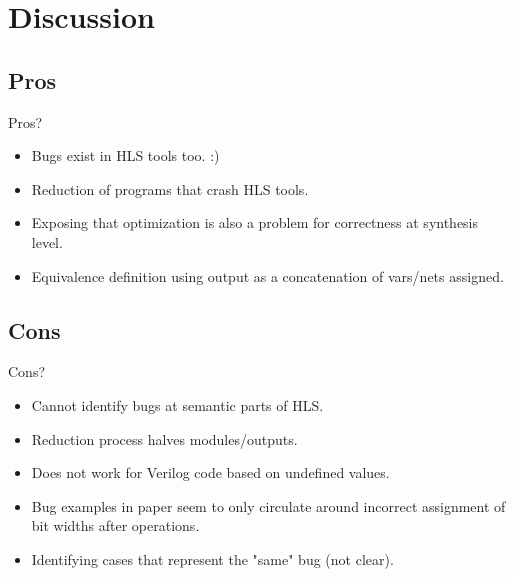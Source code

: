 \documentclass[xcolor=dvipsnames]{beamer}
\begin{document}

    \section{Discussion}
    \subsection{Pros}
    \begin{frame}{Pros?}
        
        \begin{itemize}
            \item Bugs exist in HLS tools too. :)
            \item Reduction of programs that crash HLS tools. 
            \item Exposing that optimization is also a problem for correctness at synthesis level. 
            \item Equivalence definition using output as a concatenation of vars/nets assigned. 
        \end{itemize}

    \end{frame}

    \subsection{Cons}
    \begin{frame}{Cons?}
        
        \begin{itemize}
            \item Cannot identify bugs at semantic parts of HLS. 
            \item Reduction process halves modules/outputs. 
            \item Does not work for Verilog code based on undefined values. 
            \item Bug examples in paper seem to only circulate around incorrect assignment of bit widths after operations.
            \item Identifying cases that represent the "same" bug (not clear).  
        \end{itemize}

    \end{frame}
\end{document}
